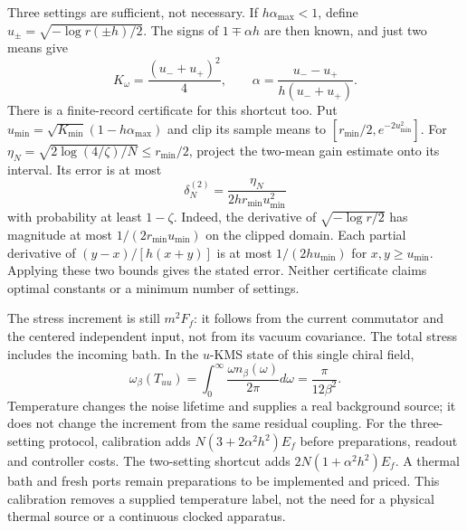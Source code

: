 \documentclass[11pt]{article}
\theoremstyle{definition}
\theoremstyle{remark}
\begin{document}
Three settings are sufficient, not necessary. If
$h\alpha_{\max}<1$, define $u_\pm=\sqrt{-\log r(\pm h)/2}$.
The signs of $1\mp\alpha h$ are then known, and just two means give
\begin{equation}
 K_\omega=\frac{(u_-+u_+)^2}{4},\qquad
 \alpha=\frac{u_--u_+}{h(u_-+u_+)}.
 \label{eq:two_unknown_bath}
\end{equation}
There is a finite-record certificate for this shortcut too. Put
$u_{\min}=\sqrt{K_{\min}}(1-h\alpha_{\max})$ and clip its sample
means to $[r_{\min}/2,e^{-2u_{\min}^2}]$.
For $\eta_N=\sqrt{2\log(4/\zeta)/N}\le r_{\min}/2$, project the
two-mean gain estimate onto its interval. Its error is at most
\[
 \delta_N^{(2)}=\frac{\eta_N}{2h r_{\min}u_{\min}^2}
\]
with probability at least $1-\zeta$. Indeed, the derivative of
$\sqrt{-\log r/2}$ has magnitude at most
$1/(2r_{\min}u_{\min})$ on the clipped domain. Each partial derivative
of $(y-x)/[h(x+y)]$ is at most $1/(2h u_{\min})$ for $x,y\ge u_{\min}$.
Applying these two bounds gives the stated error. Neither certificate
claims optimal constants or a minimum number of settings.

The stress increment is still $m^2F_f$: it follows from the current
commutator and the centered independent input, not from its vacuum
covariance. The total stress includes the incoming bath. In the $u$-KMS
state of this single chiral field,
\[
 \omega_\beta(T_{uu})=\int_0^\infty\frac{\omega n_\beta(\omega)}{2\pi}
        d\omega=\frac{\pi}{12\beta^2}.
\]
Temperature changes the noise lifetime and supplies a real background
source; it does not change the increment from the same residual coupling.
For the three-setting protocol, calibration adds
$N(3+2\alpha^2h^2)E_f$ before preparations, readout and controller costs.
The two-setting shortcut adds $2N(1+\alpha^2h^2)E_f$. A thermal bath and
fresh ports remain preparations to be implemented and priced. This
calibration removes a supplied temperature label, not the need for a
physical thermal source or a continuous clocked apparatus.
\end{document}
